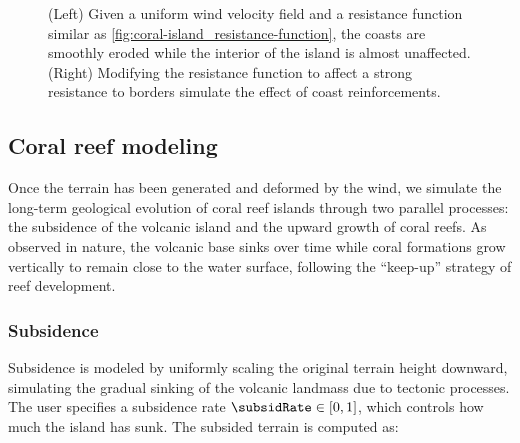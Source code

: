 \documentclass{egpubl}
\begin{document}
\begin{figure}
    \caption{(Left) Given a uniform wind velocity field and a resistance function similar as \cref{fig:coral-island_resistance-function}, the coasts are smoothly eroded while the interior of the island is almost unaffected. (Right) Modifying the resistance function to affect a strong resistance to borders simulate the effect of coast reinforcements.}
    \label{fig:coral-island_resistance-result}
\end{figure}




\subsection{Coral reef modeling}
\label{sec:coral-island_coral-reef}

Once the terrain has been generated and deformed by the wind, we simulate the long-term geological evolution of coral reef islands through two parallel processes: the subsidence of the volcanic island and the upward growth of coral reefs. As observed in nature, the volcanic base sinks over time while coral formations grow vertically to remain close to the water surface, following the “keep-up” strategy of reef development.

\subsubsection{Subsidence}
\label{sec:coral-island_subsidence}

Subsidence is modeled by uniformly scaling the original terrain height downward, simulating the gradual sinking of the volcanic landmass due to tectonic processes. The user specifies a subsidence rate $\subsidRate \in [0, 1]$, which controls how much the island has sunk. The subsided terrain is computed as:
\end{document}
